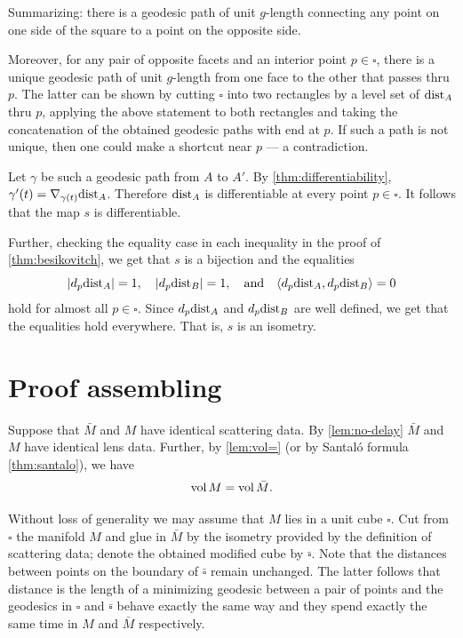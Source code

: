 Summarizing: there is a geodesic path of unit $g$-length connecting any point on one side of the square to a point on the opposite side.

Moreover, for any pair of opposite facets and an interior point $p\in\square$, there is a unique geodesic path of unit $g$-length from one face to the other that passes thru $p$.
The latter can be shown by cutting $\square$ into two rectangles by a level set of $\mathrm{dist}_A$ thru $p$,
applying the above statement to both rectangles and taking the concatenation of the obtained geodesic paths with end at $p$.
If such a path is not unique, then one could make a shortcut near $p$ --- a contradiction.

Let $\gamma$ be such a geodesic path from $A$ to $A'$.
By \ref{thm:differentiability}, $\gamma'(t)\z=\nabla_{\gamma(t)}\distfun_A$.
Therefore $\mathrm{dist}_A$ is differentiable at every point $p\in \square$.
It follows that the map $s$ is differentiable.

Further, checking the equality case in each inequality in the proof of \ref{thm:besikovitch}, we get that $s$ is a bijection and the equalities
\[|d_{p}\mathrm{dist}_A|= 1,\quad|d_{p}\mathrm{dist}_B|=1,\quad \text{and}\quad \langle d_{p}\mathrm{dist}_A,d_{p}\mathrm{dist}_B\rangle= 0\]
hold for almost all $p\in\square$.
Since $d_{p}\mathrm{dist}_A$ and $d_{p}\mathrm{dist}_B$ are well defined, we get that the equalities hold everywhere.
That is, $s$ is an isometry.
\qeds


\section{Proof assembling}

Suppose that $\bar M$ and $M$ have identical scattering data.
By \ref{lem:no-delay} $\bar M$ and $M$ have identical lens data.
Further, by \ref{lem:vol=} (or by Santal\'{o} formula \ref{thm:santalo}), we have
\[\operatorname{\rm vol}\nolimits M=\operatorname{\rm vol}\nolimits \bar M.\]

Without loss of generality we may assume that $M$ lies in a unit cube $\square$.
Cut from $\square$ the manifold $M$ and glue in $\bar M$ by the isometry provided by the definition of scattering data; denote the obtained modified cube by $\bar\square$. 
Note that the distances between points on the boundary of $\bar\square$ remain unchanged.
The latter follows that distance is the length of a minimizing geodesic between a pair of points and the geodesics in $\square$ and $\bar\square$ behave exactly the same way and they spend exactly the same time in $M$ and $\bar M$ respectively.

